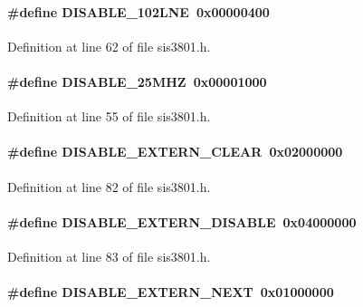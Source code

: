 \paragraph[{DISABLE\_\-102LNE}]{\setlength{\rightskip}{0pt plus 5cm}\#define DISABLE\_\-102LNE~0x00000400}\hfill\label{sis3801_8h_aed9521bf45b7f2429709a1cd752b984b}


Definition at line 62 of file sis3801.h.
\paragraph[{DISABLE\_\-25MHZ}]{\setlength{\rightskip}{0pt plus 5cm}\#define DISABLE\_\-25MHZ~0x00001000}\hfill\label{sis3801_8h_a629bd372c7271c8cb7da41b18fde9a0c}


Definition at line 55 of file sis3801.h.
\paragraph[{DISABLE\_\-EXTERN\_\-CLEAR}]{\setlength{\rightskip}{0pt plus 5cm}\#define DISABLE\_\-EXTERN\_\-CLEAR~0x02000000}\hfill\label{sis3801_8h_a79110edb6ef2e3d5d877c4be9b5b829a}


Definition at line 82 of file sis3801.h.
\paragraph[{DISABLE\_\-EXTERN\_\-DISABLE}]{\setlength{\rightskip}{0pt plus 5cm}\#define DISABLE\_\-EXTERN\_\-DISABLE~0x04000000}\hfill\label{sis3801_8h_abeb2c422e1a6ea2cbae5f5f5d28f73ba}


Definition at line 83 of file sis3801.h.
\paragraph[{DISABLE\_\-EXTERN\_\-NEXT}]{\setlength{\rightskip}{0pt plus 5cm}\#define DISABLE\_\-EXTERN\_\-NEXT~0x01000000}\hfill\label{sis3801_8h_a84a1706939167532cf940f6ef7682175}


